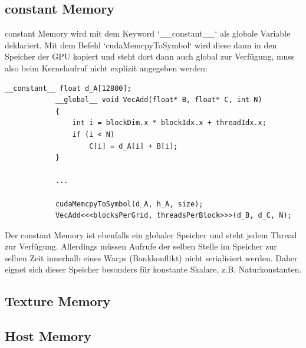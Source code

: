 		\subsection{constant Memory}
		\Gls{constant Memory} wird mit dem Keyword \li`__constant__` als globale Variable deklariert. Mit dem Befehl \li`cudaMemcpyToSymbol` wird diese dann in den Speicher der GPU kopiert und steht dort dann auch global zur Verfügung, muss also beim \Gls{Kernel}aufruf nicht explizit angegeben werden:
		\begin{lstlisting}[caption=Vektoraddition constant Memory]
			__constant__ float d_A[12800];
			__global__ void VecAdd(float* B, float* C, int N)
			{
    			int i = blockDim.x * blockIdx.x + threadIdx.x;
    			if (i < N)
        			C[i] = d_A[i] + B[i];
			}
			
			...
			
			cudaMemcpyToSymbol(d_A, h_A, size);
			VecAdd<<<blocksPerGrid, threadsPerBlock>>>(d_B, d_C, N);
		\end{lstlisting}
		
		Der \gls{constant Memory} ist ebenfalls ein globaler Speicher und steht jedem \Gls{Thread} zur Verfügung. Allerdings müssen Aufrufe der selben Stelle im Speicher zur selben Zeit innerhalb eines \Glspl{Warp} (Bankkonflikt) nicht serialisiert werden. Daher eignet sich dieser Speicher besonders für konstante Skalare, z.B. Naturkonstanten.
		
		\subsection{Texture Memory}
		
		\subsection{Host Memory}
		
		\newpage
